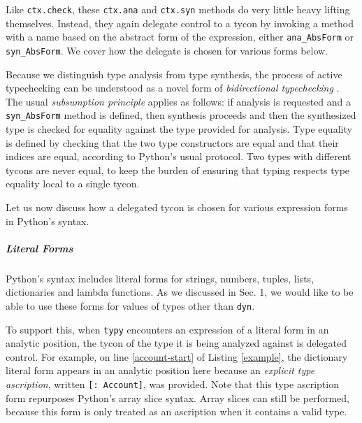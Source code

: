 \documentclass[preprint,10pt]{sigplanconf}
\newcommand{\lip}[1]{\lstinline[language=Python,basicstyle=\ttfamily\small,deletendkeywords={tuple,buffer,map}]{#1}}
\begin{document}
Like \lip{ctx.check}, these \lip{ctx.ana} and \lip{ctx.syn} methods do very little heavy lifting themselves. Instead, they again delegate control to a tycon by invoking a method with a name based on the abstract form of the expression, either \lip{ana_AbsForm} or \lip{syn_AbsForm}. We cover how the delegate is chosen for various forms below.

Because we distinguish type analysis from type synthesis, the process of active typechecking can be understood as a novel form of \emph{bidirectional typechecking} \cite{Pierce:2000:LTI:345099.345100}. The usual \emph{subsumption principle} applies as follows: if analysis is requested and a \lip{syn_AbsForm} method is defined, then synthesis proceeds and then the synthesized type is checked for equality against the type provided for analysis. Type equality is defined by checking that the two type constructors are equal and that their indices are equal, according to Python's usual protocol. Two types with different tycons are never equal, to keep the burden of ensuring that typing respects type equality local to a single tycon.%

Let us now discuss how a delegated tycon is chosen for various expression forms in Python's syntax.

\subparagraph{Literal Forms}
Python's syntax includes literal forms for strings, numbers, tuples, lists, dictionaries and lambda functions. As we discussed in Sec. 1, we would like to be able to use these forms for values of types other than \lip{dyn}.%

To support this, when \lip{typy} encounters an expression of a literal form  in an analytic position, the tycon of the type it is being analyzed against is delegated control. For example, on line \ref{account-start} of Listing \ref{example}, the dictionary literal form appears in an analytic position here because an \emph{explicit type ascription}, written \lip{[: Account]}, was provided. Note that this type ascription form repurposes Python's array slice syntax. Array slices can still be performed, because this form is only treated as an ascription when it contains a valid type. 
\end{document}
